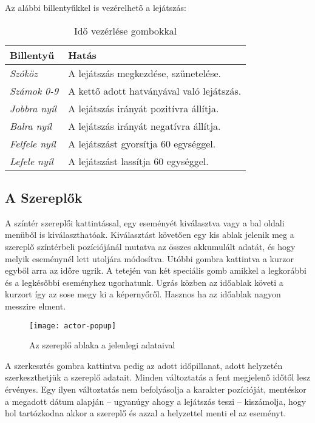 Az alábbi billentyűkkel is vezérelhető a lejátszás:

\begin{table}[H]
	\centering
	\begin{tabular}{ | m{} | m{} | }
		\hline
		\textbf{Billentyű} & \textbf{Hatás}\\
		\hline \hline
		\emph{Szóköz} & A lejátszás megkezdése, szünetelése. \\
		\hline
		\emph{Számok 0-9} & A kettő adott hatványával való lejátszás. \\
		\hline
		\emph{Jobbra nyíl} & A lejátszás irányát pozitívra állítja.  \\
		\hline
		\emph{Balra nyíl} & A lejátszás irányát negatívra állítja.  \\
		\hline
		\emph{Felfele nyíl} & A lejátszást gyorsítja 60 egységgel. \\
		\hline
		\emph{Lefele nyíl} & A lejátszást lassítja 60 egységgel.  \\
		\hline
	\end{tabular}
	\caption{Idő vezérlése gombokkal}
	\label{tab:tool-time-control-keys}
\end{table}

\subsection{A Szereplők} \label{section:ui-actors}

A színtér szereplői kattintással, egy eseményét kiválasztva vagy a bal oldali menüből is kiválaszthatóak. Kiválasztást követően egy kis ablak jelenik meg a szereplő színtérbeli pozíciójánál mutatva az összes akkumulált adatát, és hogy melyik eseménynél lett utoljára módosítva. Utóbbi gombra kattintva a kurzor egyből arra az időre ugrik. A tetején van két speciális gomb amikkel a legkorábbi és a legkésőbbi eseményhez ugorhatunk. Ugrás közben az időablak követi a kurzort így az sose megy ki a képernyőről. Hasznos ha az időablak nagyon messzire elment.

\begin{figure}[h!]
	\centering
	\texttt{[image: actor-popup]}
	\caption{Az szereplő ablaka a jelenlegi adataival}
	\label{fig:actor-popup}
\end{figure}

A szerkesztés gombra kattintva pedig az adott időpillanat, adott helyzetén szerkeszthetjük a szereplő adatait. Minden változtatás a fent megjelenő időtől lesz érvényes. Egy ilyen változtatás nem befolyásolja a karakter pozícióját, mentéskor a megadott dátum alapján -- ugyanúgy ahogy a lejátszás teszi -- kiszámolja, hogy hol tartózkodna akkor a szereplő és azzal a helyzettel menti el az eseményt.

